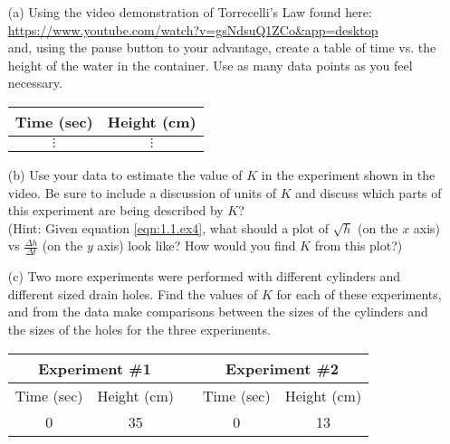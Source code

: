 \begin{lab}
\begin{enumerate}
    \item[(a)] Using the video demonstration of Torrecelli's Law found here: \\
            \href{https://www.youtube.com/watch?v=gsNdsuQ1ZCo&app=desktop}{https://www.youtube.com/watch?v=gsNdsuQ1ZCo\&app=desktop}
            \\ and, using the pause button to your advantage, create a table of time vs.
            the height of the water in the container. Use as many data points as you feel
            necessary.
            \begin{center}
                \begin{tabular}{|c|c|}
                    \hline
                    Time (sec) & Height (cm) \\ \hline \hline
                    $\vdots$ & $\vdots$ \\
                    \hline
                \end{tabular}
            \end{center}
        \item[(b)] Use your data to estimate the value of $K$ in the experiment shown in the
            video. Be sure to include a discussion of units of $K$ and discuss which parts
            of this experiment are being described by $K$? \\ (Hint: Given equation
            \eqref{eqn:1.1.ex4}, what should a plot of $\sqrt{h}$ (on the $x$ axis) vs
            $\frac{\Delta h}{\Delta t}$ (on the $y$ axis) look like? How would you find
            $K$ from this plot?) 
        \item[(c)] Two more experiments were performed with different cylinders and different
            sized drain holes. Find the values of $K$ for each of these experiments, and
            from the data make comparisons between the sizes of the cylinders and the
            sizes of the holes for the three experiments.
            \begin{center}
                \begin{tabular}{|c|c|c|c|c|}
                    \hline
                    \multicolumn{2}{|c|}{Experiment \#1} & \hspace{0.2in} &
                    \multicolumn{2}{|c|}{Experiment \#2} \\ \hline 
                    Time (sec) & Height (cm) & & Time (sec) & Height (cm) \\ \hline \hline
                    0      & 35  & &  0     & 13  \\

\end{tabular}
\end{center}
\end{enumerate}
\end{lab}
